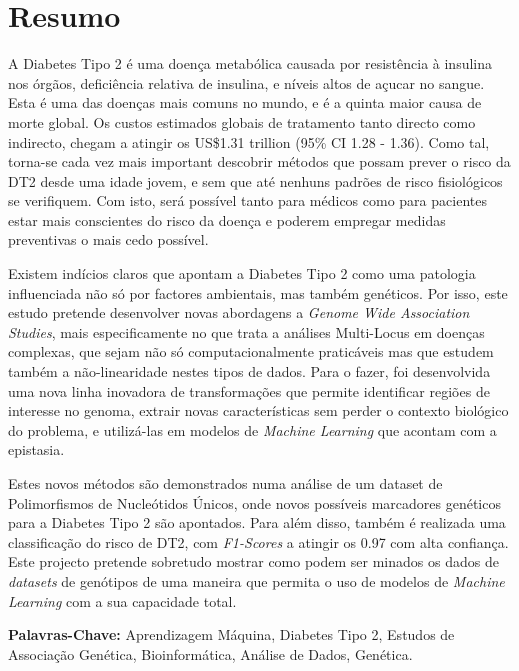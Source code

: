 
\chapter*{Resumo}

A Diabetes Tipo 2 é uma doença metabólica causada por resistência à insulina nos órgãos, deficiência relativa de insulina, e níveis altos de açucar no sangue. Esta é uma das doenças mais comuns no mundo, e é a quinta maior causa de morte global. Os custos estimados globais de tratamento tanto directo como indirecto, chegam a atingir os US\$1.31 trillion (95\% CI 1.28 - 1.36). Como tal, torna-se cada vez mais important descobrir métodos que possam prever o risco da DT2 desde uma idade jovem, e sem que até nenhuns padrões de risco fisiológicos se verifiquem. Com isto, será possível tanto para médicos como para pacientes estar mais conscientes do risco da doença e poderem empregar medidas preventivas o mais cedo possível.

Existem indícios claros que apontam a Diabetes Tipo 2 como uma patologia influenciada não só por factores ambientais, mas também genéticos. Por isso, este estudo pretende desenvolver novas abordagens a \textit{Genome Wide Association Studies}, mais especificamente no que trata a análises Multi-Locus em doenças complexas, que sejam não só computacionalmente praticáveis mas que estudem também a não-linearidade nestes tipos de dados. Para o fazer, foi desenvolvida uma nova linha inovadora de transformações que permite identificar regiões de interesse no genoma, extrair novas características sem perder o contexto biológico do problema, e utilizá-las em modelos de \textit{Machine Learning} que acontam com a epistasia.

Estes novos métodos são demonstrados numa análise de um dataset de Polimorfismos de Nucleótidos Únicos, onde novos possíveis marcadores genéticos para a Diabetes Tipo 2 são apontados. Para além disso, também é realizada uma classificação do risco de DT2, com \textit{F1-Scores} a atingir os 0.97 com alta confiança. Este projecto pretende sobretudo mostrar como podem ser minados os dados de \textit{datasets} de genótipos de uma maneira que permita o uso de modelos de \textit{Machine Learning} com a sua capacidade total.

\textbf{Palavras-Chave:} Aprendizagem Máquina, Diabetes Tipo 2, Estudos de Associação Genética, Bioinformática, Análise de Dados, Genética.
